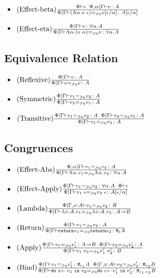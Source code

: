 {\begin{itemize}
        \item $\treerule{Effect-beta}{\wellformed{\P}{\e}\s\s\etyperelation{\P, \a}{\G}{v}{A}}{\gpeberelation{\eapp{(\elam{\a}{v}}{\e})}{v\ssub{\a}{\e}}{A\ssub{\a}{\e}}}$

        \item $\treerule{Effect-eta}{\etyperelation{\P}{\G}{v}{\all{\a}{A}}}{\gpeberelation{\elam{\a}{(\eapp{v}{\a})}}{v}{\all{\a}{A}}}$
            
    \end{itemize}
        \subsection{Equivalence Relation}
    \begin{itemize}
        \item $\treerule{Reflexive}{\gpetyperelation{v}{A}}{\gpeberelation{v}{v}{A}}$
        \item $\treerule{Symmetric}{\gpeberelation{v_1}{v_2}{A}}{\gpeberelation{v_2}{v_1}{A}}$
        \item $\treerule{Transitive}{\gpeberelation{v_1}{v_2}{A}\s\s\gpeberelation{v_2}{v_3}{A}}{\gpeberelation{v_1}{v_3}{A}}$
    \end{itemize}
    \subsection{Congruences}
    \begin{itemize}
        \item $\treerule{Effect-Abs}{\eberelation{\P, \a}{\G}{v_1}{v_2}{A}}{\gpeberelation{\elam{\a}{v_1}}{\elam{\a}{v_2}}{\all{\a}{A}}}$
        \item $\treerule{Effect-Apply}{\gpeberelation{v_1}{v_2}{\all{\a}{A}}\s\s\wellformed{\P}{\e}}{\gpeberelation{\eapp{v_1}{\e}}{\eapp{v_2}{\e}}{A\ssub{\a}{\e}}}$
        \item $\treerule{Lambda}{\eberelation{\P}{\gax}{v_1}{v_2}{B}}{\gpeberelation{\lam{x}{A}{v_1}}{\lam{x}{A}{v_2}}{\ab}}$

        \item $\treerule{Return}{\gpeberelation{v_1}{v_2}{A}}{\gpeberelation{\return{v_1}}{\return{v_2}}{\moa}}$

        \item $\treerule{Apply}{\gpeberelation{v_1}{v_1'}{\ab}\s\s\gpeberelation{v_2}{v_2'}{A}}{\gpeberelation{\apply{v_1}{v_2}}{\apply{v_1'}{v_2'}}{B}}$

        \item $\treerule{Bind}{\gpeberelation{v_1}{v_1'}{\M{\e_1}{A}} \s\s \eberelation{\P}{\gax}{v_2}{v_2'}{\M{\e_2}{B}}}{\gpeberelation{\doin{x}{v_1}{v_2}}{\doin{c}{v_1'}{v_2'}}{\M{\e_1 \dot \e_2}{B}}}$


\end{itemize}}
